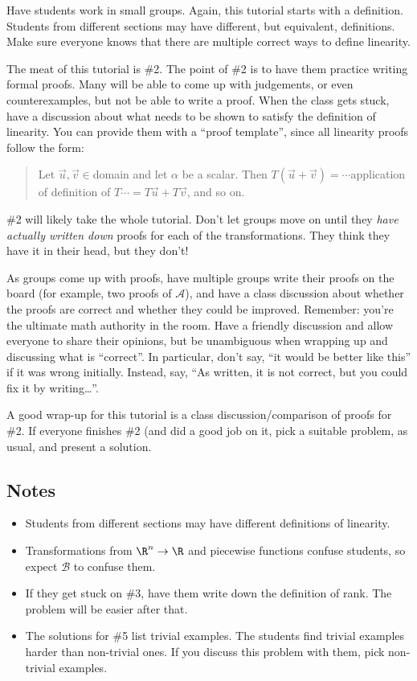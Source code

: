 	Have students work in small groups. Again, this tutorial starts with a definition. Students from
		different sections may have different, but equivalent, definitions. Make sure everyone
		knows that there are multiple correct ways to define linearity.

	The meat of this tutorial is \#2. The point of \#2 is to have them practice writing formal proofs.
		Many will be able to come up with judgements, or even counterexamples, but not be able to write
		a proof. When the class gets stuck, have a discussion about what needs to be shown
		to satisfy the definition of linearity. You can provide them with a ``proof template'', since
		all linearity proofs follow the form:
		\begin{quote}
			Let $\vec u,\vec v\in$domain and let $\alpha$ be a scalar. Then $T(\vec u+\vec v)=\cdots$application
			of definition of $T$$\cdots=T\vec u+T\vec v$, and so on.
		\end{quote}

	\#2 will likely take the whole tutorial. Don't let groups move on until they \emph{have actually written down}
		proofs for each of the transformations. They think they have it in their head, but they don't!

		As groups come up with proofs, have multiple groups write their proofs on the board (for example,
		two proofs of $\mathcal A$), and have a class discussion about whether the proofs are correct and
		whether they could be improved. Remember: you're the ultimate math authority in the room. Have a
		friendly discussion and allow everyone to share their opinions, but be unambiguous when wrapping up and discussing
		what is ``correct''. In particular, don't say, ``it would be better like this'' if it was wrong initially. Instead,
		say, ``As written, it is not correct, but you could fix it by writing\ldots''.
	
	A good wrap-up for this tutorial is a class discussion/comparison of proofs for \#2. If everyone finishes \#2 (and
	did a good job on it, pick a suitable problem, as usual, and present a solution.

\subsection*{Notes}
	\begin{itemize}
		\item Students from different sections may have different definitions of linearity.
		\item Transformations from $\R^n\to \R$ and piecewise functions confuse students, so
			expect $\mathcal B$ to confuse them.
		\item If they get stuck on \#3, have them write down the definition of rank. The problem
			will be easier after that.
		\item The solutions for \#5 list trivial examples. The students find trivial examples
			harder than non-trivial ones. If you discuss this problem with them, pick non-trivial examples.
	\end{itemize}